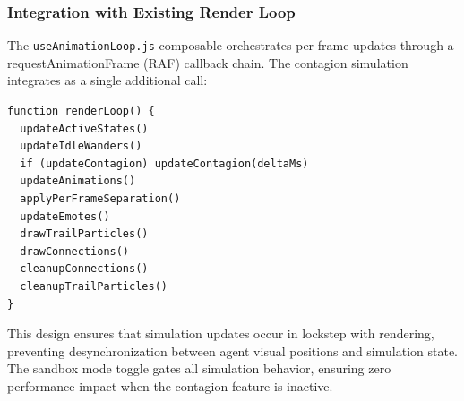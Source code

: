\subsubsection{Integration with Existing Render Loop}
\label{sec:render-loop-integration}

The \texttt{useAnimationLoop.js} composable orchestrates per-frame updates through a requestAnimationFrame (RAF) callback chain. The contagion simulation integrates as a single additional call:

\begin{verbatim}
function renderLoop() {
  updateActiveStates()
  updateIdleWanders()
  if (updateContagion) updateContagion(deltaMs)
  updateAnimations()
  applyPerFrameSeparation()
  updateEmotes()
  drawTrailParticles()
  drawConnections()
  cleanupConnections()
  cleanupTrailParticles()
}
\end{verbatim}

This design ensures that simulation updates occur in lockstep with rendering, preventing desynchronization between agent visual positions and simulation state. The sandbox mode toggle gates all simulation behavior, ensuring zero performance impact when the contagion feature is inactive.
